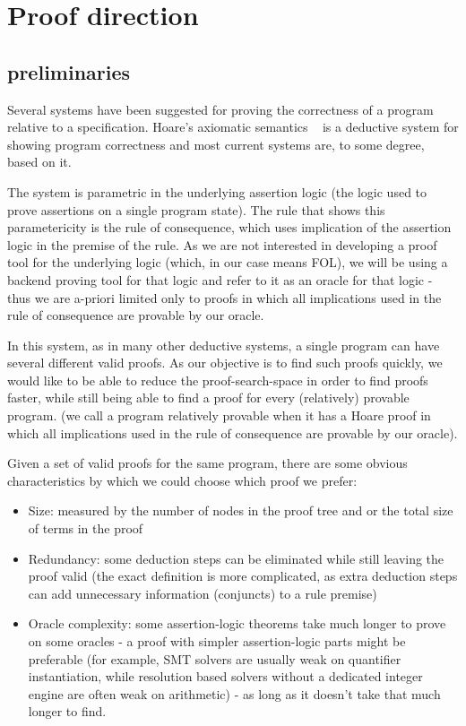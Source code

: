 \section{Proof direction}

\subsection*{preliminaries}
Several systems have been suggested for proving the correctness of a program relative to a specification.
Hoare's axiomatic semantics ~\cite{DBLP:journals/cacm/Hoare69} is a deductive system for showing program correctness and most current systems are, to some degree, based on it.

The system is parametric in the underlying assertion logic (the logic used to prove assertions on a single program state).
The rule that shows this parametericity is the rule of consequence, which uses implication of the assertion logic in the premise of the rule. As we are not interested in developing a proof tool for the underlying logic (which, in our case means FOL), we will be using a backend proving tool for that logic and refer to it as an oracle for that logic - thus we are a-priori limited only to proofs in which all implications used in the rule of consequence are provable by our oracle.

In this system, as in many other deductive systems, a single program can have several different valid proofs.
As our objective is to find such proofs quickly, we would like to be able to reduce the proof-search-space in order to find proofs faster, while still being able to find a proof for every (relatively) provable program.
(we call a program relatively provable when it has a Hoare proof in which all implications used in the rule of consequence are provable by our oracle).

Given a set of valid proofs for the same program, there are some obvious characteristics by which we could choose which proof we prefer:
\begin{itemize}
	\item Size: measured by the number of nodes in the proof tree and or the total size of terms in the proof
	\item Redundancy: some deduction steps can be eliminated while still leaving the proof valid (the exact definition is more complicated, as extra deduction steps can add unnecessary information (conjuncts) to a rule premise)
	\item Oracle complexity: some assertion-logic theorems take much longer to prove on some oracles - a proof with simpler assertion-logic parts might be preferable (for example, SMT solvers are usually weak on quantifier instantiation, while resolution based solvers without a dedicated integer engine are often weak on arithmetic) - as long as it doesn't take that much longer to find.
\end{itemize}

